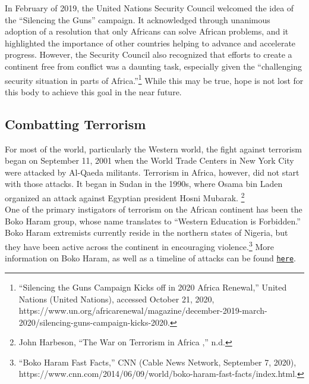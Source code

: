 \documentclass[10pt, letterpaper]{article}
\begin{document}
In February of 2019, the United Nations Security Council welcomed the
idea of the ``Silencing the Guns'' campaign. It acknowledged through
unanimous adoption of a resolution that only Africans can solve African
problems, and it highlighted the importance of other countries helping
to advance and accelerate progress. However, the Security Council also
recognized that efforts to create a continent free from conflict was a
daunting task, especially given the ``challenging security situation in
parts of Africa.''\footnote{``Silencing the Guns Campaign Kicks off in
  2020 \textbar{} Africa Renewal,'' United Nations (United Nations),
  accessed October 21, 2020,
  https://www.un.org/africarenewal/magazine/december-2019-march-2020/silencing-guns-campaign-kicks-2020.}
While this may be true, hope is not lost for this body to achieve this
goal in the near future. \\

\subsection{Combatting Terrorism}

For most of the world, particularly the Western world, the fight against
terrorism began on September 11, 2001 when the World Trade Centers in
New York City were attacked by Al-Qaeda militants. Terrorism in Africa,
however, did not start with those attacks. It began in Sudan in the
1990s, where Osama bin Laden organized an attack against Egyptian
president Hosni Mubarak. \footnote{John Harbeson, ``The War on Terrorism
  in Africa ,'' n.d.} \\

One of the primary instigators of terrorism on the African continent has
been the Boko Haram group, whose name translates to ``Western Education
is Forbidden.'' Boko Haram extremists currently reside in the northern
states of Nigeria, but they have been active across the continent in
encouraging violence.\footnote{``Boko Haram Fast Facts,'' CNN (Cable
  News Network, September 7, 2020),
  https://www.cnn.com/2014/06/09/world/boko-haram-fast-facts/index.html.}
More information on Boko Haram, as well as a timeline of attacks can be
found \texttt{\href{https://www.cnn.com/2014/06/09/world/boko-haram-fast-facts/index.html}{here}}.\\
\end{document}
